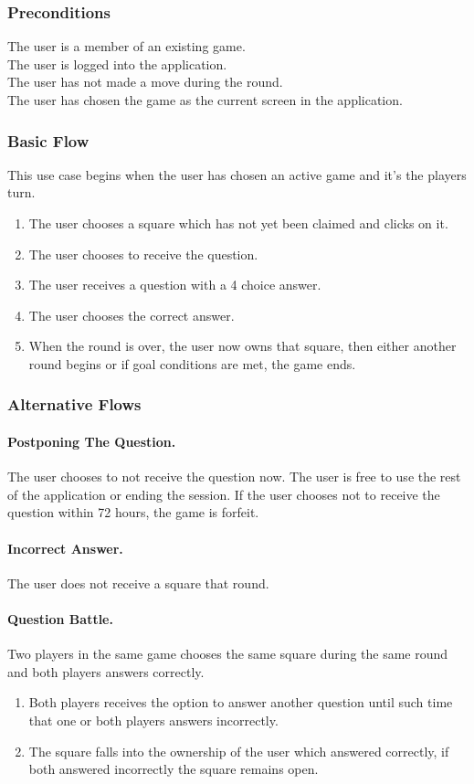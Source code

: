 \subsubsection{Preconditions}
The user is a member of an existing game.\\
The user is logged into the application.\\
The user has not made a move during the round.\\
The user has chosen the game as the current screen in the application.

\subsubsection{Basic Flow}
This use case begins when the user has chosen an active game and it's the players turn.
\begin{enumerate}
	\item The user chooses a square which has not yet been claimed and clicks on it.
	\item The user chooses to receive the question.
	\item The user receives a question with a 4 choice answer.
	\item The user chooses the correct answer.
	\item When the round is over, the user now owns that square, then either another round begins or if goal conditions are met, the game ends.
\end{enumerate}

\subsubsection{Alternative Flows}
\paragraph{Postponing The Question.}
The user chooses to not receive the question now.
The user is free to use the rest of the application or ending the session.
If the user chooses not to receive the question within 72 hours, the game is forfeit.

\paragraph{Incorrect Answer.}
The user does not receive a square that round.

\paragraph{Question Battle.}
Two players in the same game chooses the same square during the same round and both players answers correctly.
\begin{enumerate}
	\item Both players receives the option to answer another question until such time that one or both players answers incorrectly.
	\item The square falls into the ownership of the user which answered correctly, if both answered incorrectly the square remains open.
\end{enumerate}

